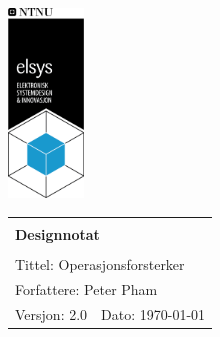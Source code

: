 \begin{minipage}[c]{0.15\textwidth}
\includegraphics[width=2cm]{Images/elsys_pos_staaende_ntnu.png}
\end{minipage}
\begin{minipage}[c]{0.80\textwidth}

\renewcommand{\arraystretch}{1.7}
\large 
\begin{tabularx}{\textwidth}{|X|X|}
\hline
\multicolumn{2}{|l|}{} \\
\multicolumn{2}{|l|}{\huge \textbf{Designnotat}} \\
\multicolumn{2}{|l|}{}  \\
\hline
\multicolumn{2}{|l|}{Tittel: 
Operasjonsforsterker
} \\
\hline
\multicolumn{2}{|l|}{Forfattere: 
Peter Pham
} \\
\hline
Versjon: 2.0 & Dato: \today
\\
\hline 
\end{tabularx}
\end{minipage}
\normalsize


